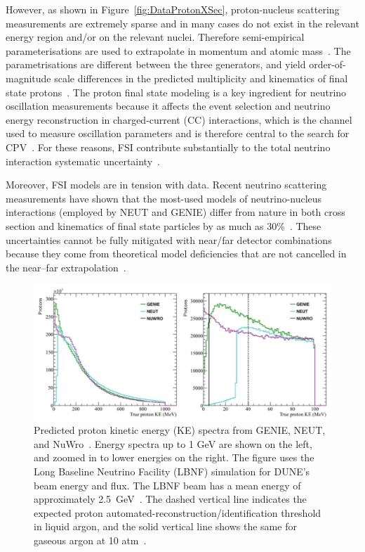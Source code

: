 However, as shown in Figure~\ref{fig:DataProtonXSec}, proton-nucleus scattering measurements are extremely sparse and in many cases do not exist in the relevant energy region and/or on the relevant nuclei.
Therefore semi-empirical parameterisations are used to extrapolate in momentum and atomic mass~\cite{wellisch1996total}.  
The parametrisations are different between the three generators, and yield order-of-magnitude scale differences in the predicted multiplicity and kinematics of final state protons~\cite{dune2018high}.
The proton final state modeling is a key ingredient for neutrino oscillation measurements because it affects the event selection and neutrino energy reconstruction in charged-current (CC) interactions, which is the channel used to measure oscillation parameters and is therefore central to the search for CPV~\cite{Abe:2013hdq}.
For these reasons, FSI contribute substantially to the total neutrino interaction systematic uncertainty~\cite{Abe:2019vii}. 

Moreover, FSI models are in tension with data.  
Recent neutrino scattering measurements have shown that the most-used models of neutrino-nucleus interactions (employed by NEUT and GENIE) differ from nature in both cross section and kinematics of final state particles by as much as 30\%~\cite{McFarland:2018aaa}. 
These uncertainties cannot be fully mitigated with near/far detector combinations because they come from theoretical model deficiencies that are not cancelled in the near–far extrapolation~\cite{Coloma:2013rqa}. 

\begin{figure}%
    \centering
    \includegraphics[width=12cm]{files/Figures/protons_from_argon.jpeg}%
    \caption{Predicted proton kinetic energy (KE) spectra from GENIE, NEUT, and NuWro~\cite{Raaf:2018aaa}. Energy spectra up to 1 GeV are shown on the left, and zoomed in to lower energies on the right. The figure uses the Long Baseline Neutrino Facility (LBNF)  simulation for DUNE's beam energy and flux. The LBNF beam has a mean energy of approximately 2.5~GeV~\cite{abi2020deep}. The dashed vertical line indicates the expected proton automated-reconstruction/identification threshold in liquid argon, and the solid vertical line shows the same for gaseous argon at 10 atm~\cite{dune2018high}.}
    \label{fig:protonsfromargon}%
\end{figure}

